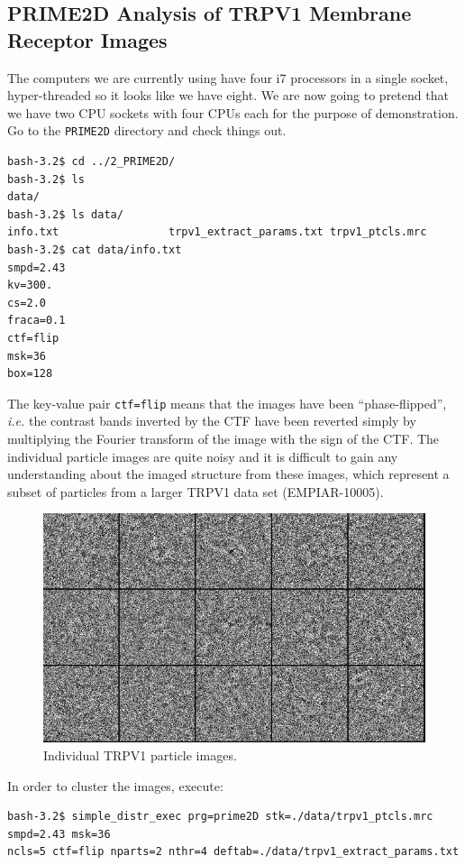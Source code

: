 \documentclass[a4paper,11pt]{article}
\begin{document}
\subsection{PRIME2D Analysis of TRPV1 Membrane Receptor Images}
The computers we are currently using have four i7 processors in a single socket, hyper-threaded so it looks like we have eight. We are now going to pretend that we have two CPU sockets with four CPUs each for the purpose of demonstration. Go to the \texttt{PRIME2D} directory and check things out.
\begin{verbatim}
bash-3.2$ cd ../2_PRIME2D/
bash-3.2$ ls
data/
bash-3.2$ ls data/
info.txt                 trpv1_extract_params.txt trpv1_ptcls.mrc
bash-3.2$ cat data/info.txt 
smpd=2.43
kv=300.
cs=2.0
fraca=0.1
ctf=flip
msk=36
box=128
\end{verbatim}
The key-value pair \texttt{ctf=flip} means that the images have been ``phase-flipped'', \textit{i.e.} the contrast bands inverted by the CTF have been reverted simply by multiplying the Fourier transform of the image with the sign of the CTF. The individual particle images are quite noisy and it is difficult to gain any understanding about the imaged structure from these images, which represent a subset of particles from a larger TRPV1 data set (EMPIAR-10005). 
\begin{figure}
\includegraphics[keepaspectratio=true,scale=0.3]{./trpv1ptcls}
\caption{Individual TRPV1 particle images.}
\end{figure}
In order to cluster the images, execute:
\begin{verbatim}
bash-3.2$ simple_distr_exec prg=prime2D stk=./data/trpv1_ptcls.mrc smpd=2.43 msk=36 
ncls=5 ctf=flip nparts=2 nthr=4 deftab=./data/trpv1_extract_params.txt
\end{verbatim}
\end{document}
